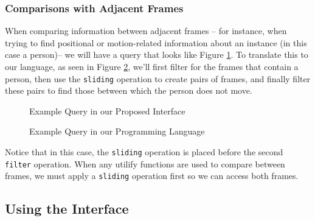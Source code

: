 \subsubsection{Comparisons with Adjacent Frames}
When comparing information between adjacent frames -- for instance, when trying to find positional or motion-related information about an instance (in this case a person)-- we will have a query that looks like Figure \ref{fig:Comp1}. To translate this to our language, as seen in Figure \ref{fig:Comp2}, we'll first filter for the frames that contain a person, then use the \texttt{sliding} operation to create pairs of frames, and finally filter these pairs to find those between which the person does not move. 

\begin{figure}[H]
    \caption{Example Query in our Proposed Interface}
    \label{fig:Comp1}
\end{figure}

\begin{figure}[H]
    \caption{Example Query in our Programming Language}
    \label{fig:Comp2}
\end{figure}

Notice that in this case, the \texttt{sliding} operation is placed before the second \texttt{filter} operation. When any utilify functions are used to compare between frames, we must apply a  \texttt{sliding} operation first so we can access both frames.

\subsection{Using the Interface}

